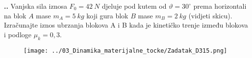 

\noindent 
\textbf{
\thecjelina.\thezadatak.}
Vanjska sila iznosa $F_0=42\ N$ djeluje pod kutem od $\vartheta = 30^\circ$ prema horizontali na blok $A$ mase $m_A=5 \ kg$ koji gura blok 
$B$ mase $m_B=2\ kg$ (vidjeti skicu). Izračunajte iznos ubrzanja blokova A i B kada je kinetičko trenje između blokova i podloge $\mu _k=0,3$.

\begin{figure}[h]%
  \begin{center}
    \texttt{[image: ../03\_Dinamika\_materijalne\_tocke/Zadatak\_D315.png]}
  \end{center}
\end{figure}

